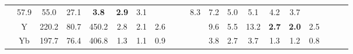 \documentclass[french,10pt]{article}
\begin{document}
\begin{landscape}
\begin{longtable}{ l  c | c c c | c c c | c c c | c c c | c c c | c c c | }
                    &                     57.9
     & {\footnotesize     55.0
    } & {\footnotesize     27.1
     }
    
    
                    &                     \textbf{ 3.8}
     & {\footnotesize     \textbf{ 2.9}
    } & {\footnotesize     3.1
     }
    
    
                    & & &

                    &                     8.3
     & {\footnotesize     7.2
    } & {\footnotesize     5.0
     }
    
    
                    &                     5.1
     & {\footnotesize     4.2
    } & {\footnotesize     3.7
     }
    
    
                    & & &

                    \\*
                        & {\small Y  }

                    &                     220.2
     & {\footnotesize     80.7
    } & {\footnotesize     450.2
     }
    
    
                    &                     2.8
     & {\footnotesize     2.1
    } & {\footnotesize     2.6
     }
    
    
                    & & &

                    &                     9.6
     & {\footnotesize     5.5
    } & {\footnotesize     13.2
     }
    
    
                    &                     \textbf{ 2.7}
     & {\footnotesize     \textbf{ 2.0}
    } & {\footnotesize     2.5
     }
    
    
                    & & &

                    \\*
                        & {\small Yb  }

                    &                     197.7
     & {\footnotesize     76.4
    } & {\footnotesize     406.8
     }
    
    
                    &                     1.3
     & {\footnotesize     1.1
    } & {\footnotesize     0.9
     }
    
    
                    & & &

                    &                     3.8
     & {\footnotesize     2.7
    } & {\footnotesize     3.7
     }
    
    
                    &                     1.3
     & {\footnotesize     1.2
    } & {\footnotesize     0.8
     }
    

\end{longtable}
\end{landscape}
\end{document}
